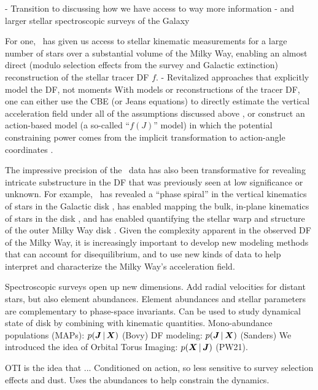 - Transition to discussing how we have access to way more information
- and larger stellar spectroscopic surveys of the Galaxy \citep{APOGEE, GALAH, RAVE, LAMOST, TODO}



For one, \gaia\ has given us access to stellar kinematic measurements for a large number
of stars over a substantial volume of the Milky Way, enabling an almost direct (modulo
selection effects from the survey and Galactic extinction) reconstruction of the stellar
tracer DF $f$.
- Revitalized approaches that explicitly model the DF, not moments
With models or reconstructions of the tracer DF, one can either use the CBE (or Jeans
equations) to directly estimate the vertical acceleration field under all of the
assumptions discussed above \citep{greggreen, jatanbuch, TODO}, or construct an
action-based model (a so-called ``$f(J)$'' model) in which the potential constraining
power comes from the implicit transformation to action-angle coordinates \citep{sanders,
others}.

The impressive precision of the \gaia\ data has also been transformative for revealing
intricate substructure in the DF that was previously seen at low significance or
unknown.
For example, \gaia\ has revealed a ``phase spiral'' in the vertical kinematics of stars
in the Galactic disk \citep[e.g.,][]{Antoja, many, TODO}, has enabled mapping the bulk,
in-plane kinematics of stars in the disk \citep[e.g.,][]{Katz, Eilers, TODO}, and has
enabled quantifying the stellar warp and structure of the outer Milky Way disk
\citep[e.g.,][]{Poggio, Antoja, TODO}.
Given the complexity apparent in the observed DF of the Milky Way, it is increasingly
important to develop new modeling methods that can account for disequilibrium, and to
use new kinds of data to help interpret and characterize the Milky Way's acceleration
field.

Spectroscopic surveys open up new dimensions.
Add radial velocities for distant stars, but also element abundances.
Element abundances and stellar parameters are complementary to phase-space invariants.
Can be used to study dynamical state of disk by combining with kinematic quantities.
Mono-abundance populations (MAPs): $p(\boldsymbol{J} \,|\, \boldsymbol{X})$ (Bovy)
DF modeling: $p(\boldsymbol{J} \,|\, \boldsymbol{X})$ (Sanders)
We introduced the idea of Orbital Torus Imaging: $p(\boldsymbol{X} \,|\, \boldsymbol{J})$ (PW21).

OTI is the idea that ...
Conditioned on action, so less sensitive to survey selection effects and dust.
Uses the abundances to help constrain the dynamics.

